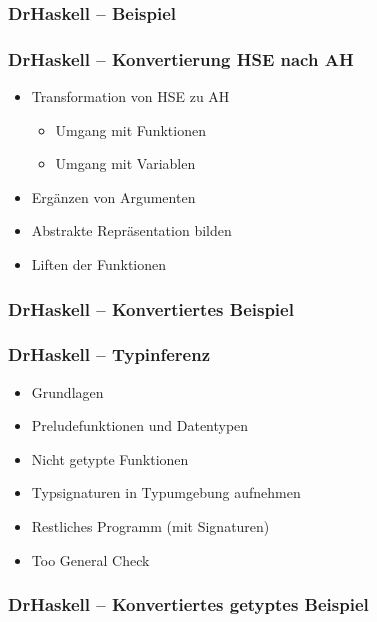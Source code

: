 \begin{frame}[fragile]
\frametitle{DrHaskell -- Beispiel}

\end{frame}

\begin{frame}
	\frametitle{DrHaskell -- Konvertierung HSE nach AH}
	\begin{itemize}
		\item Transformation von HSE zu AH
		  \begin{itemize}
		    \item Umgang mit Funktionen
		    \item Umgang mit Variablen
		  \end{itemize}
		\item Ergänzen von Argumenten
		\item Abstrakte Repräsentation bilden
		\item Liften der Funktionen
	\end{itemize}
\end{frame}

\begin{frame}[fragile]
\frametitle{DrHaskell -- Konvertiertes Beispiel}

\end{frame}

\begin{frame}
  \frametitle{DrHaskell -- Typinferenz}
  \begin{itemize}
    \item Grundlagen
    \item Preludefunktionen und Datentypen
    \item Nicht getypte Funktionen
    \item Typsignaturen in Typumgebung aufnehmen
    \item Restliches Programm (mit Signaturen)
    \item \glqq{}Too General Check\grqq{}
  \end{itemize}
\end{frame}

\begin{frame}[fragile]
\frametitle{DrHaskell -- Konvertiertes getyptes Beispiel}

\end{frame}
